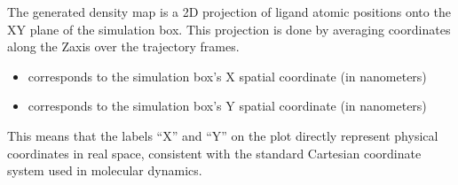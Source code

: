 \documentclass[a4paper,10pt,english]{sphinxmanual}
\let\sphinxpxdimen\pdfpxdimen\else\newdimen\sphinxpxdimen
\begin{document}
\sphinxAtStartPar
{}

\sphinxAtStartPar
The generated density map is a 2D projection of ligand atomic positions onto the XY plane of the simulation box. This projection is done by averaging coordinates along the Z\sphinxhyphen{}axis over the trajectory frames.
\begin{itemize}
\item {} 
\sphinxAtStartPar
{} corresponds to the simulation box’s X spatial coordinate (in nanometers)

\item {} 
\sphinxAtStartPar
{} corresponds to the simulation box’s Y spatial coordinate (in nanometers)

\end{itemize}

\sphinxAtStartPar
This means that the labels “X” and “Y” on the plot directly represent physical coordinates in real space, consistent with the standard Cartesian coordinate system used in molecular dynamics.

\begin{sphinxVerbatim}[commandchars=\\\{\}]
  
                          
                         
                          
\end{sphinxVerbatim}

\noindent{\hspace*{\fill}\sphinxincludegraphics[width=600\sphinxpxdimen]{{ligand_density}.png}\hspace*{\fill}}
\end{document}
